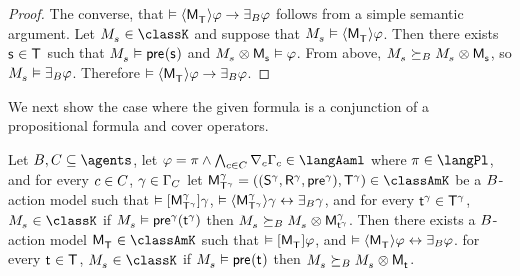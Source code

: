 \begin{proof}
The converse, that $\entails \actionE{\aPModel{\aStatesT}} \phi \implies \someactsBs \phi$ follows from a simple semantic argument.
Let $\kPModel{\kStateS} \in \classK$ and suppose that $\kPModel{\kStateS} \entails \actionE{\aPModel{\aStatesT}} \phi$.
Then there exists $\aStateS \in \aStatesT$ such that $\kPModel{\kStateS} \entails \aPrecondition(\aStateS)$ and $\kPModel{\kStateS} \exec \aPModel{\aStateS} \entails \phi$.
From above, $\kPModel{\kStateS} \simulatesBs \kPModel{\kStateS} \exec \aPModel{\aStateS}$, so $\kPModel{\kStateS} \entails \someactsBs \phi$.
Therefore $\entails \actionE{\aPModel{\aStatesT}} \phi \implies \someactsBs \phi$.
\end{proof}

We next show the case where the given formula is a conjunction of a propositional formula and cover operators.

\begin{lemma}\label{aaml-k-covers}
Let $\agentsB, \agentsC \subseteq \agents$, 
let $\phi = \pi \land \bigwedge_{\agentC \in \agentsC} \coverC \Gamma_\agentC \in \langAaml$ where $\pi \in \langPl$, and 
for every $\agentC \in \agentsC$, $\gamma \in \Gamma_\agentsC$
let $\aPModelAndTuple[\gamma]{\aStatesT[\gamma]} \in \classAmK$ be a $\agentsB$-action model such that 
$\entails \actionA{\aPModel[\gamma]{\aStatesT[\gamma]}} \gamma$,
$\entails \actionE{\aPModel[\gamma]{\aStatesT[\gamma]}} \gamma \iff \someactsBs \gamma$, and
for every $\aStateT[\gamma] \in \aStatesT[\gamma]$, $\kPModel{\kStateS} \in \classK$ if $\kPModel{\kStateS} \entails \aPrecondition[\gamma](\aStateT[\gamma])$ then $\kPModel{\kStateS} \simulatesBs \kPModel{\kStateS} \exec \aPModel[\gamma]{\aStateT[\gamma]}$.
Then there exists a $\agentsB$-action model $\aPModel{\aStatesT} \in \classAmK$ such that 
$\entails \actionA{\aPModel{\aStatesT}} \phi$, and 
$\entails \actionE{\aPModel{\aStatesT}} \phi \iff \someactsBs \phi$.
for every $\aStateT \in \aStatesT$, $\kPModel{\kStateS} \in \classK$ if $\kPModel{\kStateS} \entails \aPrecondition(\aStateT)$ then $\kPModel{\kStateS} \simulatesBs \kPModel{\kStateS} \exec \aPModel{\aStateT}$.
\end{lemma}

\pagebreak

